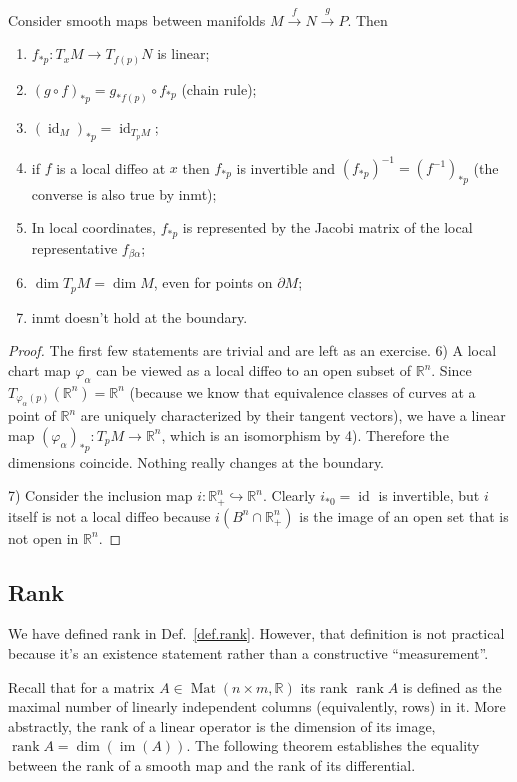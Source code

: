 \documentclass[english,letterpaper]{article}%
\numberwithin{equation}{section}
\numberwithin{figure}{section}
\numberwithin{table}{section}
\theoremstyle{definition}
\theoremstyle{definition}
\theoremstyle{definition}
\theoremstyle{plain}
\theoremstyle{plain}
\theoremstyle{plain}
\theoremstyle{plain}
\theoremstyle{remark}
\theoremstyle{remark}
\DeclareMathOperator{\id}{id}
\DeclareMathOperator{\Mat}{Mat}
\DeclareMathOperator{\im}{im}
\DeclareMathOperator{\rank}{rank}
\begin{document}
\begin{thm}\label{prop of push-forwards}
Consider smooth maps between manifolds $M\overset{f}{\to}N\overset{g}{\to}P$. Then
\begin{enumerate}
    \item $f_{\ast p}:T_x M\to T_{f(p)} N$ is linear;
    \item $(g\circ f)_{\ast p}=g_{\ast f(p)}\circ f_{\ast p}$ (chain rule);
    \item $(\id_M)_{\ast p}=\id_{T_p M}$;
    \item if $f$ is a local diffeo at $x$ then $f_{\ast p}$ is invertible and $(f_{\ast p})^{-1}=(f^{-1})_{\ast p}$ (the converse is also true by \gls{inmt});
    \item In local coordinates, $f_{\ast p}$ is represented by the Jacobi matrix of the local representative $f_{\beta\alpha}$;
    \item $\dim T_p M=\dim M$, even for points on $\partial M$;
    \item \gls{inmt} doesn't hold at the boundary.
\end{enumerate}
\end{thm}
\begin{proof}
The first few statements are trivial and are left as an exercise.
6) A local chart map $\varphi_\alpha$ can be viewed as a local diffeo to an open subset of $\mathbb{R}^n$. Since $T_{\varphi_\alpha(p)}(\mathbb{R}^n)=\mathbb{R}^n$ (because we know that equivalence classes of curves at a point of $\mathbb{R}^n$ are uniquely characterized by their tangent vectors), we have a linear map $(\varphi_\alpha)_{\ast p}:T_p M\to \mathbb{R}^n$, which is an isomorphism by 4). Therefore the dimensions coincide. Nothing really changes at the boundary.

7) Consider the inclusion map $i:\mathbb{R}^n_+\hookrightarrow \mathbb{R}^n$. Clearly $i_{\ast 0}=\id$ is invertible, but $i$ itself is not a local diffeo because $i(B^n\cap \mathbb{R}^n_+)$ is the image of an open set that is not open in $\mathbb{R}^n$.
\end{proof}

\subsection{Rank}
We have defined rank in Def.~\ref{def.rank}. However, that definition is not practical because it's an existence statement rather than a constructive ``measurement''.

Recall that for a matrix $A\in \Mat(n\times m,\mathbb{R})$ its rank $\rank A$ is defined as the maximal number of linearly independent columns (equivalently, rows) in it. More abstractly, the rank of a linear operator is the dimension of its image, $\rank A=\dim(\im (A))$. The following theorem establishes the equality between the rank of a smooth map and the rank of its differential.
\end{document}
